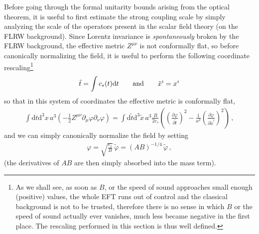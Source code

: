 \documentclass[12pt]{article}
\def\ba{\begin{eqnarray}}
\def\ea{\end{eqnarray}}
\def\d{\mathrm{d}}
\def\({\left(}
\def\){\right)}
\def\p{\partial}
\def\p{\partial}
\begin{document}
Before going through the formal unitarity bounds arising from the optical theorem, it is useful to first estimate the strong coupling scale by simply analyzing the scale of the operators present in the scalar field theory (on the FLRW background). Since Lorentz invariance is {\it spontaneously} broken by the FLRW background, the effective metric $Z^{\mu\nu}$ is not conformally flat, so before canonically normalizing the field, it is useful to perform the following coordinate rescaling\footnote{As we shall see, as soon as $B$, or the speed of sound approaches small enough (positive) values, the whole EFT runs out of control and the classical background is not to be trusted, therefore there is no sense in which $B$ or the speed of sound actually ever vanishes, much less became negative in the first place. The rescaling performed in this section is thus well defined.}
\ba
\tilde t = \int c_s (t) \d t \qquad {\rm and }\qquad \tilde{x}^i = x^i
\ea
so that in this system of coordinates the effective metric is conformally flat,
\ba
\int \d t \d^3 x \, a^3\(  -\frac 12 Z^{\mu\nu} \p_\mu \varphi \p_\nu \varphi \)= \int \d \tilde t \d^3 \tilde x \, a^3 \frac{B}{2c_s}
\(\(\frac{\p \varphi}{\p \tilde t}\)^2-\frac{1}{a^2}\(\frac{\p \varphi}{\p \tilde{x}^i}\)^2\)\,,
\ea
and we can simply canonically normalize the field by setting
\ba
\varphi=\sqrt{\frac{c_s}{B}} \, \tilde \varphi =\(A B\)^{-1/4}\,  \tilde \varphi \,,
\ea
(the derivatives of $AB$ are then simply absorbed into the mass term).\\
\end{document}
